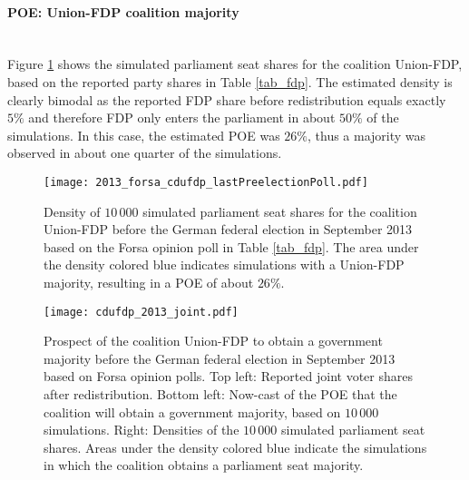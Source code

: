 \documentclass[smallextended]{svjour3}      %
\begin{document}
\paragraph{POE: Union-FDP coalition majority} \ \\

Figure \ref{fig:seatDist} shows the simulated parliament seat shares for the
coalition Union-FDP, based on the reported party shares in Table \ref{tab_fdp}.
The estimated density is clearly bimodal as the reported FDP share before
redistribution equals exactly $5\%$ and therefore FDP only enters the parliament
in about $50\%$ of the simulations. In this case, the estimated POE was $26\%$,
thus a majority was observed in about one quarter of the simulations. \\

\begin{figure}[H]\centering
\texttt{[image: 2013\_forsa\_cdufdp\_lastPreelectionPoll.pdf]}
\caption{Density of $10\,000$ simulated parliament seat shares for the coalition
Union-FDP before the German federal election in September 2013 based on the Forsa
opinion poll in Table \ref{tab_fdp}. The area under the density colored blue
indicates simulations with a Union-FDP majority, resulting in a
POE of about $26\%$.
\label{fig:seatDist}
}
\end{figure}

\begin{figure}[H]\centering
\texttt{[image: cdufdp\_2013\_joint.pdf]}
\caption{Prospect of the coalition Union-FDP to obtain a government majority before the
German federal election in September 2013 based on Forsa opinion polls.
Top left: Reported joint voter shares after redistribution.
Bottom left: Now-cast of the POE that the coalition will obtain a government
majority, based on $10\,000$ simulations.
Right: Densities of the $10\,000$ simulated parliament seat shares. Areas under
the density colored blue indicate the simulations in which the coalition
obtains a parliament seat majority.
\label{fig:seatDist_time}
}
\end{figure}
\end{document}
